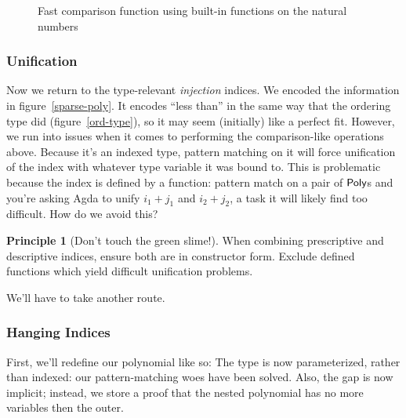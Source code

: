 \documentclass[draft, twocolumn]{article}
\theoremstyle{definition}
\theoremstyle{definition}
\newtheorem{principle}{Principle}[section]
\begin{document}
\begin{figure}
  \centering
  \caption{Fast comparison function using built-in functions on the natural
    numbers}
  \label{fast-cmp}
\end{figure}
\subsubsection{Unification}
Now we return to the type-relevant \emph{injection} indices. We encoded the
information in figure~\ref{sparse-poly}. It encodes ``less than'' in the same
way that the ordering type did (figure~\ref{ord-type}), so it may seem
(initially) like a perfect fit. However, we run into issues when it comes to
performing the comparison-like operations above. Because it's an indexed type,
pattern matching on it will force unification of the index with whatever type
variable it was bound to. This is problematic because the index is defined by a
function: pattern match on a pair of \(\AgdaDatatype{Poly}\)s and you're asking
Agda to unify \(i_1 + j_1\) and \(i_2 + j_2\), a task it will likely find too
difficult. How do we avoid this?
\begin{principle}[Don't touch the green slime!]
  When combining prescriptive and descriptive indices, ensure both are in
  constructor form. Exclude defined functions which yield difficult unification
  problems\cite{mcbride_polynomial_2018}.
\end{principle}
We'll have to take another route.
\subsubsection{Hanging Indices}
First, we'll redefine our polynomial like so:
The type is now parameterized, rather than indexed: our pattern-matching woes
have been solved. Also, the gap is now implicit; instead, we store a proof that
the nested polynomial has no more variables then the outer.
\end{document}
